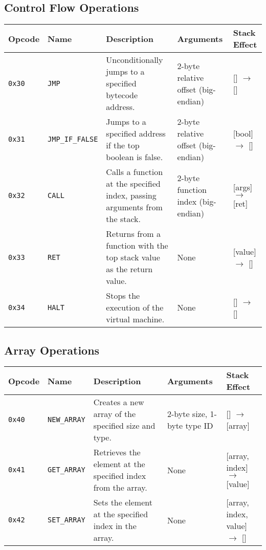 \documentclass[a4paper,12pt]{article}
\begin{document}
    \subsection{Control Flow Operations}
    \begin{tabular}{|l|l|p{4cm}|l|l|}
    \hline
    \textbf{Opcode} & \textbf{Name} & \textbf{Description} & \textbf{Arguments} & \textbf{Stack Effect} \\ \hline
    \texttt{0x30} & \texttt{JMP} & Unconditionally jumps to a specified bytecode address. & 2-byte relative offset (big-endian) & [] $\rightarrow$ [] \\ \hline
    \texttt{0x31} & \texttt{JMP\_IF\_FALSE} & Jumps to a specified address if the top boolean is false. & 2-byte relative offset (big-endian) & [bool] $\rightarrow$ [] \\ \hline
    \texttt{0x32} & \texttt{CALL} & Calls a function at the specified index, passing arguments from the stack. & 2-byte function index (big-endian) & [args] $\rightarrow$ [ret] \\ \hline
    \texttt{0x33} & \texttt{RET} & Returns from a function with the top stack value as the return value. & None & [value] $\rightarrow$ [] \\ \hline
    \texttt{0x34} & \texttt{HALT} & Stops the execution of the virtual machine. & None & [] $\rightarrow$ [] \\ \hline
    \end{tabular}
    \label{tab:control_flow_operations}

    \subsection{Array Operations}
    \begin{tabular}{|l|l|p{2.5cm}|l|l|}
    \hline
    \textbf{Opcode} & \textbf{Name} & \textbf{Description} & \textbf{Arguments} & \textbf{Stack Effect} \\ \hline
    \texttt{0x40} & \texttt{NEW\_ARRAY} & Creates a new array of the specified size and type. & 2-byte size, 1-byte type ID & [] $\rightarrow$ [array] \\ \hline
    \texttt{0x41} & \texttt{GET\_ARRAY} & Retrieves the element at the specified index from the array. & None & [array, index] $\rightarrow$ [value] \\ \hline
    \texttt{0x42} & \texttt{SET\_ARRAY} & Sets the element at the specified index in the array. & None & [array, index, value] $\rightarrow$ [] \\ \hline
    \end{tabular}
    \label{tab:array_operations}
\end{document}
